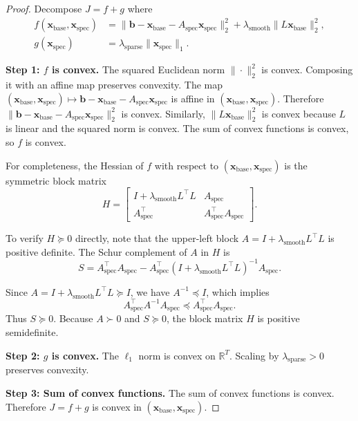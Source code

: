 \documentclass[10pt,a4paper]{amsart}
\newcommand{\Aspec}{A_{\text{spec}}}
\newcommand{\bvec}{\mathbf{b}}
\newcommand{\xbase}{\mathbf{x}_{\text{base}}}
\newcommand{\xspec}{\mathbf{x}_{\text{spec}}}
\begin{document}
\begin{proof}
Decompose $J = f + g$ where
\begin{align*}
f(\xbase, \xspec) &= \|\bvec - \xbase - \Aspec \xspec\|_2^2 + \lambda_{\text{smooth}} \|L \xbase\|_2^2, \\
g(\xspec) &= \lambda_{\text{sparse}} \|\xspec\|_1.
\end{align*}

\textbf{Step 1: $f$ is convex.} The squared Euclidean norm $\|\cdot\|_2^2$ is convex. Composing it with an affine map preserves convexity. The map $(\xbase, \xspec) \mapsto \bvec - \xbase - \Aspec \xspec$ is affine in $(\xbase, \xspec)$. Therefore $\|\bvec - \xbase - \Aspec \xspec\|_2^2$ is convex. Similarly, $\|L \xbase\|_2^2$ is convex because $L$ is linear and the squared norm is convex. The sum of convex functions is convex, so $f$ is convex.

For completeness, the Hessian of $f$ with respect to $(\xbase, \xspec)$ is the symmetric block matrix
\begin{equation}
H = \begin{bmatrix} I + \lambda_{\text{smooth}} L^\top L & \Aspec \\ \Aspec^\top & \Aspec^\top \Aspec \end{bmatrix}.
\end{equation}

To verify $H \succeq 0$ directly, note that the upper-left block $A = I + \lambda_{\text{smooth}} L^\top L$ is positive definite. The Schur complement of $A$ in $H$ is
\begin{equation}
S = \Aspec^\top \Aspec - \Aspec^\top (I + \lambda_{\text{smooth}} L^\top L)^{-1} \Aspec.
\end{equation}

Since $A = I + \lambda_{\text{smooth}} L^\top L \succeq I$, we have $A^{-1} \preceq I$, which implies
\begin{equation}
\Aspec^\top A^{-1} \Aspec \preceq \Aspec^\top \Aspec.
\end{equation}
Thus $S \succeq 0$. Because $A \succ 0$ and $S \succeq 0$, the block matrix $H$ is positive semidefinite.

\textbf{Step 2: $g$ is convex.} The $\ell_1$ norm is convex on $\mathbb{R}^T$. Scaling by $\lambda_{\text{sparse}} > 0$ preserves convexity.

\textbf{Step 3: Sum of convex functions.} The sum of convex functions is convex. Therefore $J = f + g$ is convex in $(\xbase, \xspec)$.
\end{proof}
\end{document}
